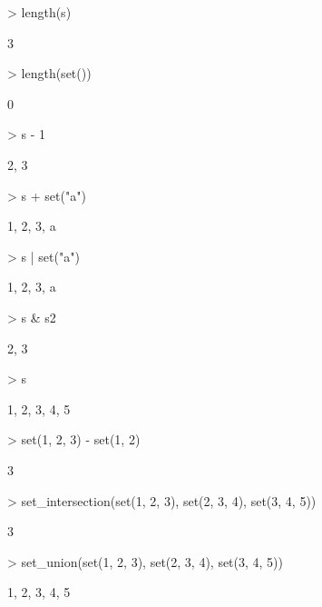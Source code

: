 \documentclass[fleqn]{article}
\begin{document}
\begin{Schunk}
\begin{Sinput}
> length(s)
\end{Sinput}
\begin{Soutput}
[1] 3
\end{Soutput}
\begin{Sinput}
> length(set())
\end{Sinput}
\begin{Soutput}
[1] 0
\end{Soutput}
\begin{Sinput}
> s - 1
\end{Sinput}
\begin{Soutput}
{2, 3}
\end{Soutput}
\begin{Sinput}
> s + set("a")
\end{Sinput}
\begin{Soutput}
{1, 2, 3, a}
\end{Soutput}
\begin{Sinput}
> s | set("a")
\end{Sinput}
\begin{Soutput}
{1, 2, 3, a}
\end{Soutput}
\begin{Sinput}
> s & s2
\end{Sinput}
\begin{Soutput}
{2, 3}
\end{Soutput}
\begin{Sinput}
> s %
\end{Sinput}
\begin{Soutput}
{1, 2, 3, 4, 5}
\end{Soutput}
\begin{Sinput}
> set(1, 2, 3) - set(1, 2)
\end{Sinput}
\begin{Soutput}
{3}
\end{Soutput}
\begin{Sinput}
> set_intersection(set(1, 2, 3), set(2, 3, 4), set(3, 4, 5))
\end{Sinput}
\begin{Soutput}
{3}
\end{Soutput}
\begin{Sinput}
> set_union(set(1, 2, 3), set(2, 3, 4), set(3, 4, 5))
\end{Sinput}
\begin{Soutput}
{1, 2, 3, 4, 5}
\end{Soutput}
\begin{Sinput}

\end{Sinput}
\end{Schunk}
\end{document}
